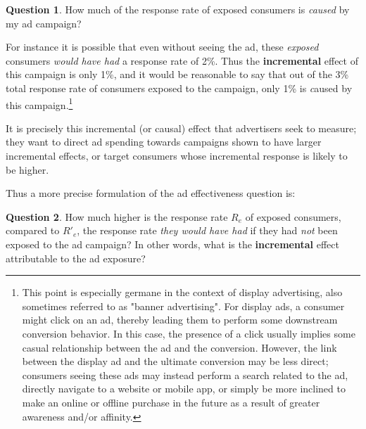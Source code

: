 \documentclass[11pt,a4paper]{article}
\theoremstyle{definition}
\theoremstyle{remark}
\theoremstyle{definition}
\theoremstyle{definition}
\theoremstyle{definition}
\newtheorem{question}{Question}[section]
\theoremstyle{definition}
\theoremstyle{definition}
\theoremstyle{definition}
\begin{document}
\begin{question}\small
	How much of the response rate of exposed consumers is  \textit{caused} by my ad campaign? 
\end{question}


For instance it is possible that even without seeing the ad, these {\em exposed} consumers {\em would have had} a response rate of 2\%. Thus the {\bf incremental} effect of this campaign is only 1\%, and it would be reasonable to say that out of the 3\% total response rate of consumers exposed to the campaign, only 1\% is {\emph caused} by this campaign.\footnote{This point is especially germane in the context of display advertising, also sometimes referred to as "banner advertising". For display ads, a consumer might click on an ad, thereby leading them to perform some downstream conversion behavior. In this case, the presence of a click usually implies some casual relationship between the ad and the conversion. However, the link between the display ad and the ultimate conversion may be less direct; consumers seeing these ads may instead perform a search related to the ad, directly navigate to a website or mobile app, or simply be more inclined to make an online or offline purchase in the future as a result of greater awareness and/or affinity.}

It is precisely this incremental (or causal) effect that advertisers seek to measure; they want to direct ad spending towards  campaigns shown to have larger incremental effects, or target consumers whose incremental response is likely to be higher.

Thus a more precise formulation of the ad effectiveness question is:
\begin{question} \label{q-incr}\small
	How much higher is the response rate $R_e$ of exposed consumers, compared to $R'_e$, the response rate {\em they would have had} if they had {\em not} been exposed to the ad campaign? In other words, what is the \textbf{incremental} effect attributable to the ad exposure?
\end{question}
\end{document}
